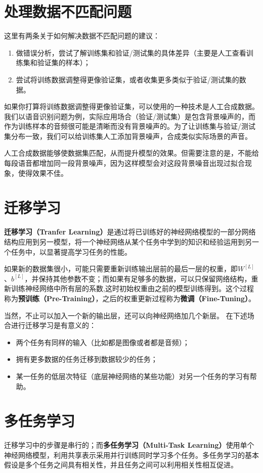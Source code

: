 \documentclass[../../main.tex]{subfiles}
\begin{document}
\section{处理数据不匹配问题}
这里有两条关于如何解决数据不匹配问题的建议：
\begin{enumerate}
    \item 做错误分析，尝试了解训练集和验证/测试集的具体差异（主要是人工查看训练集和验证集的样本）；
    \item 尝试将训练数据调整得更像验证集，或者收集更多类似于验证/测试集的数据。
\end{enumerate}

如果你打算将训练数据调整得更像验证集，可以使用的一种技术是人工合成数据。我们以语音识别问题为例，实际应用场合（验证/测试集）是包含背景噪声的，而作为训练样本的音频很可能是清晰而没有背景噪声的。为了让训练集与验证/测试集分布一致，我们可以给训练集人工添加背景噪声，合成类似实际场景的声音。

人工合成数据能够使数据集匹配，从而提升模型的效果。但需要注意的是，不能给每段语音都增加同一段背景噪声，因为这样模型会对这段背景噪音出现过拟合现象，使得效果不佳。

\section{迁移学习}
\textbf{迁移学习（Tranfer Learning）}是通过将已训练好的神经网络模型的一部分网络结构应用到另一模型，将一个神经网络从某个任务中学到的知识和经验运用到另一个任务中，以显著提高学习任务的性能。

如果新的数据集很小，可能只需要重新训练输出层前的最后一层的权重，即\(W^{[L]}\)、\(b^{[L]}\)，并保持其他参数不变；而如果有足够多的数据，可以只保留网络结构，重新训练神经网络中所有层的系数,这时初始权重由之前的模型训练得到。这个过程称为\textbf{预训练（Pre-Training）}，之后的权重更新过程称为\textbf{微调（Fine-Tuning）}。

当然，不止可以加入一个新的输出层，还可以向神经网络加几个新层。
在下述场合进行迁移学习是有意义的：
\begin{itemize}
    \item 两个任务有同样的输入（比如都是图像或者都是音频）；
    \item 拥有更多数据的任务迁移到数据较少的任务；
    \item 某一任务的低层次特征（底层神经网络的某些功能）对另一个任务的学习有帮助。
\end{itemize}

\section{多任务学习}
迁移学习中的步骤是串行的；而\textbf{多任务学习（Multi-Task Learning）}使用单个神经网络模型，利用共享表示采用并行训练同时学习多个任务。多任务学习的基本假设是多个任务之间具有相关性，并且任务之间可以利用相关性相互促进。
\end{document}
